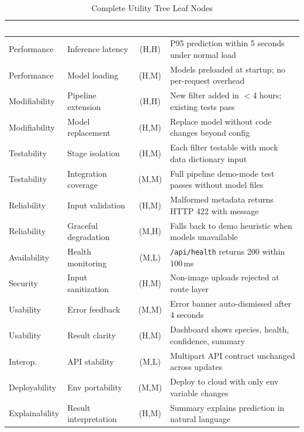\documentclass[11pt,a4paper,oneside]{report}
\newcommand{\code}[1]{\texttt{\footnotesize #1}}
\begin{document}
\begin{table}[H]
\centering\footnotesize
\caption{Complete Utility Tree Leaf Nodes}
\label{tab:utility-tree}
\begin{tabularx}{\textwidth}{p{2cm} p{2.2cm} c X}
\toprule
\rowcolor{tableheader}
\textcolor{white}{QA} & \textcolor{white}{Refinement} & \textcolor{white}{(I,R)} & \textcolor{white}{Scenario} \\
\midrule
Performance     & Inference latency      & (H,H) & P95 prediction within 5 seconds under normal load \\
Performance     & Model loading          & (H,M) & Models preloaded at startup; no per-request overhead \\
Modifiability   & Pipeline extension     & (H,H) & New filter added in $<$4 hours; existing tests pass \\
Modifiability   & Model replacement      & (H,M) & Replace model without code changes beyond config \\
Testability     & Stage isolation        & (H,M) & Each filter testable with mock data dictionary input \\
Testability     & Integration coverage   & (M,M) & Full pipeline demo-mode test passes without model files \\
Reliability     & Input validation       & (H,M) & Malformed metadata returns HTTP 422 with message \\
Reliability     & Graceful degradation   & (M,H) & Falls back to demo heuristic when models unavailable \\
Availability    & Health monitoring      & (M,L) & \code{/api/health} returns 200 within 100\,ms \\
Security        & Input sanitization     & (H,M) & Non-image uploads rejected at route layer \\
Usability       & Error feedback         & (M,M) & Error banner auto-dismissed after 4 seconds \\
Usability       & Result clarity         & (H,M) & Dashboard shows species, health, confidence, summary \\
Interop.        & API stability          & (M,L) & Multipart API contract unchanged across updates \\
Deployability   & Env portability        & (M,M) & Deploy to cloud with only env variable changes \\
Explainability  & Result interpretation  & (H,M) & Summary explains prediction in natural language \\
\bottomrule
\end{tabularx}
\end{table}
\end{document}
